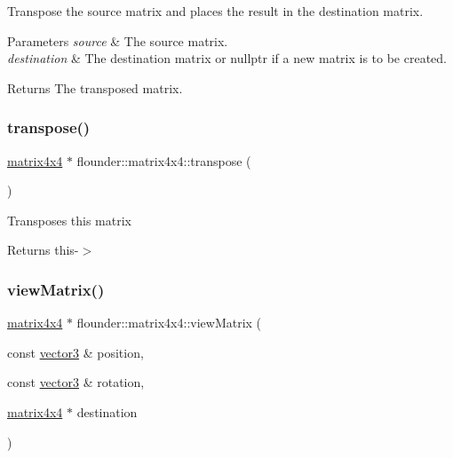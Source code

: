 Transpose the source matrix and places the result in the destination matrix. 


\begin{DoxyParams}{Parameters}
{\em source} & The source matrix. \\
\hline
{\em destination} & The destination matrix or nullptr if a new matrix is to be created. \\
\hline
\end{DoxyParams}
\begin{DoxyReturn}{Returns}
The transposed matrix. 
\end{DoxyReturn}
\mbox{\label{classflounder_1_1matrix4x4_aaf0d086f1d886d8aedd61c070f098344}} 
\subsubsection{\texorpdfstring{transpose()}{transpose()}\hspace{0.1cm}{\footnotesize\ttfamily [2/2]}}
{\footnotesize\ttfamily \hyperlink{classflounder_1_1matrix4x4}{matrix4x4} $\ast$ flounder\+::matrix4x4\+::transpose (\begin{DoxyParamCaption}{ }\end{DoxyParamCaption})}



Transposes this matrix 

\begin{DoxyReturn}{Returns}
this-\/$>$ 
\end{DoxyReturn}
\mbox{\label{classflounder_1_1matrix4x4_aee10976c10baabe8c69374ab64431cd4}} 
\subsubsection{\texorpdfstring{view\+Matrix()}{viewMatrix()}}
{\footnotesize\ttfamily \hyperlink{classflounder_1_1matrix4x4}{matrix4x4} $\ast$ flounder\+::matrix4x4\+::view\+Matrix (\begin{DoxyParamCaption}\item[{const \hyperlink{classflounder_1_1vector3}{vector3} \&}]{position,  }\item[{const \hyperlink{classflounder_1_1vector3}{vector3} \&}]{rotation,  }\item[{\hyperlink{classflounder_1_1matrix4x4}{matrix4x4} $\ast$}]{destination }\end{DoxyParamCaption})\hspace{0.3cm}{\ttfamily [static]}}



